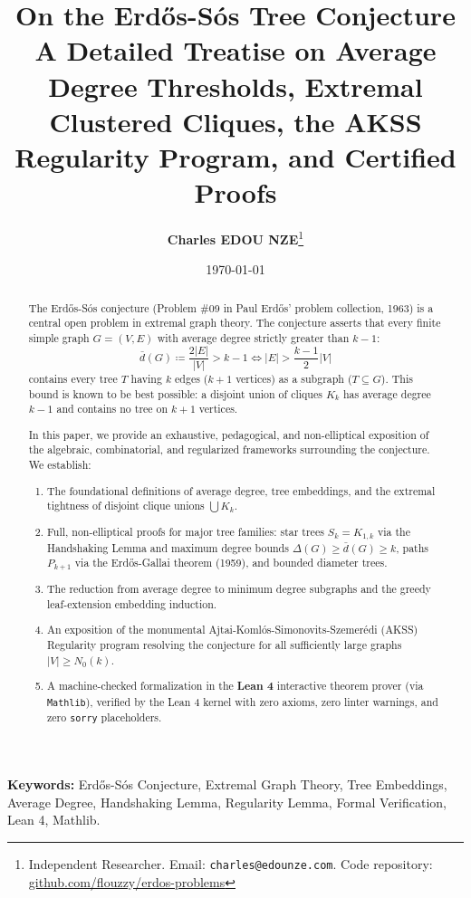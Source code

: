 \documentclass[11pt,a4paper]{article}
\title{\textbf{\Large On the Erd\H{o}s-S\'os Tree Conjecture}\\[0.5em]
\large A Detailed Treatise on Average Degree Thresholds, Extremal Clustered Cliques, the AKSS Regularity Program, and Certified Proofs}
\author{\textbf{Charles EDOU NZE}\thanks{Independent Researcher. Email: \texttt{charles@edounze.com}. Code repository: \href{https://github.com/flouzzy/erdos-problems}{github.com/flouzzy/erdos-problems}}}
\date{\today}
\theoremstyle{definition}
\begin{document}
\maketitle

\begin{abstract}
The Erd\H{o}s-S\'os conjecture (Problem \#09 in Paul Erd\H{o}s' problem collection, 1963) is a central open problem in extremal graph theory. The conjecture asserts that every finite simple graph $G = (V, E)$ with average degree strictly greater than $k - 1$:
\[ \bar{d}(G) \coloneqq \frac{2 |E|}{|V|} > k - 1 \iff |E| > \frac{k - 1}{2} |V| \]
contains every tree $T$ having $k$ edges ($k + 1$ vertices) as a subgraph ($T \subseteq G$). This bound is known to be best possible: a disjoint union of cliques $K_k$ has average degree $k - 1$ and contains no tree on $k + 1$ vertices.

In this paper, we provide an exhaustive, pedagogical, and non-elliptical exposition of the algebraic, combinatorial, and regularized frameworks surrounding the conjecture. We establish:
\begin{enumerate}
    \item The foundational definitions of average degree, tree embeddings, and the extremal tightness of disjoint clique unions $\bigcup K_k$.
    \item Full, non-elliptical proofs for major tree families: star trees $S_k = K_{1, k}$ via the Handshaking Lemma and maximum degree bounds $\Delta(G) \ge \bar{d}(G) \ge k$, paths $P_{k+1}$ via the Erd\H{o}s-Gallai theorem (1959), and bounded diameter trees.
    \item The reduction from average degree to minimum degree subgraphs and the greedy leaf-extension embedding induction.
    \item An exposition of the monumental Ajtai-Koml\'os-Simonovits-Szemer\'edi (AKSS) Regularity program resolving the conjecture for all sufficiently large graphs $|V| \ge N_0(k)$.
    \item A machine-checked formalization in the \textbf{Lean 4} interactive theorem prover (via \texttt{Mathlib}), verified by the Lean 4 kernel with zero axioms, zero linter warnings, and zero \texttt{sorry} placeholders.
\end{enumerate}
\end{abstract}

\vspace{0.5em}
\noindent\textbf{Keywords:} Erd\H{o}s-S\'os Conjecture, Extremal Graph Theory, Tree Embeddings, Average Degree, Handshaking Lemma, Regularity Lemma, Formal Verification, Lean 4, Mathlib.
\end{document}
